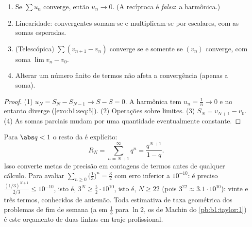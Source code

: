 \begin{proposition}\label{prop:b1:series:first}
\begin{enumerate}
  \item Se $\sum u_n$ converge, então $u_n \to 0$. (A recíproca é
        \emph{falsa}: a  harmônica.)
  \item Linearidade:  convergentes somam-se e multiplicam-se por
        escalares, com as somas esperadas.
  \item (Telescópica) $\sum (v_{n+1} -
        v_n)$ converge se e
        somente se $(v_n)$ converge, com soma $\lim v_n -
        v_0$.
  \item Alterar um número finito de termos não afeta a convergência
        (apenas a soma).
\end{enumerate}
\end{proposition}

\begin{proof}
(1) $u_N = S_N - S_{N-1} \to S - S = 0$. A  harmônica tem
$u_n = \frac1n \to 0$ e no entanto diverge (\cref{exo:b1:seq:5}). (2)
Operações sobre limites. (3) $S_N = v_{N+1} - v_0$. (4) As somas
parciais mudam por uma quantidade eventualmente constante.
\end{proof}

\begin{example}\label{ex:b1:series:georemainder}
Para $\abs q < 1$ o resto da  é
explícito:
\[
R_N = \sum_{n = N+1}^{\infty} q^n = \frac{q^{N+1}}{1 - q} .
\]
Isso converte metas de precisão em contagens de termos antes de
qualquer cálculo. Para avaliar $\sum_{n\geq0} \bigl(\frac13\bigr)^n =
\frac32$ com erro inferior a $10^{-10}$: é
preciso $\frac{(1/3)^{N+1}}{2/3} \leq
10^{-10}$, isto é, $3^{N} \geq \frac{3}{2}\cdot 10^{10}$, isto é, $N
\geq 22$ (pois $3^{22} \approx 3.1\cdot10^{10}$): vinte e três
termos, conhecidos de antemão. Toda estimativa de taxa geométrica
dos problemas de fim de semana (a  em $\frac13$ para $\ln 2$, os
 de Machin do \cref{pb:b1:taylor:1}) é este orçamento de duas linhas
em traje profissional.
\end{example}

